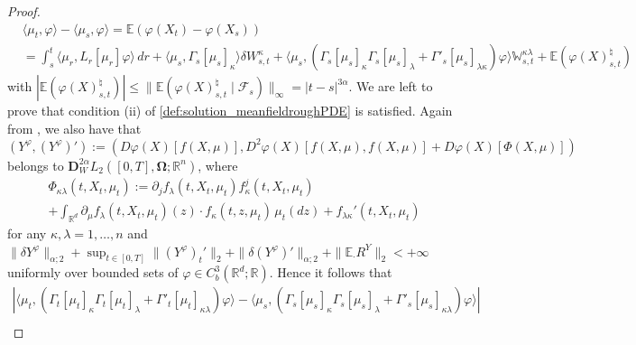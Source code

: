 \documentclass[10pt, a4paper]{article} %
\newcommand{\R}{\mathbb{R}}
\newcommand{\E}{\mathbb{E}}
\theoremstyle{definition}
\theoremstyle{plain}
\begin{document}
\begin{proof}
\begin{equation*}
        \begin{aligned}
            &\langle \mu_t , \varphi \rangle - \langle \mu_s , \varphi \rangle = \E(\varphi(X_t) - \varphi(X_s))  \\
            &= \int_s^t \langle \mu_r, L_r[\mu_r] \varphi \rangle \, dr + \langle \mu_s, \Gamma_s[\mu_s]_\kappa \rangle \delta W^\kappa_{s,t}  + \langle \mu_s, (\Gamma_s[\mu_s]_\kappa \Gamma_s[\mu_s]_\lambda + \Gamma'_s[\mu_s]_{\lambda \kappa} ) \varphi  \rangle \mathbb{W}^{\kappa\lambda}_{s,t} + \E(\varphi(X)^\natural_{s,t})
        \end{aligned}
    \end{equation*}
    with $|\E(\varphi(X)^\natural_{s,t})| \le \|\E(\varphi(X)^\natural_{s,t} \mid \mathcal{F}_s)\|_\infty = |t-s|^{3\alpha}$. 
    We are left to prove that condition (ii) of \cref{def:solution_meanfieldroughPDE} is satisfied. 
    Again from \cite[Theorem 4.13]{FHL21}, we also have that    
    \begin{equation*}
        (Y^\varphi,(Y^\varphi)'):=( D\varphi(X) [f(X,\mu)] , D^2 \varphi(X)[f(X,\mu), f(X,\mu)] + D\varphi(X) [\Phi(X,\mu)] ) 
    \end{equation*}
    belongs to $\mathbf{D}_W^{2\alpha}L_{2} ([0,T],\mathbf{\Omega};\R^n)$, where  \begin{multline*}
        \Phi_{\kappa\lambda} (t, X_t, \mu_t) := \partial_j f_\lambda(t,X_t, \mu_t) f^j_\kappa(t,X_t, \mu_t)  \\ + \int_{\R^d} \partial_\mu f_\lambda(t,X_t, \mu_t)(z) \cdot f_\kappa(t,z,\mu_t) \, \mu_t(dz) + f_{\lambda \kappa}'(t,X_t, \mu_t) 
    \end{multline*}
    for any $\kappa,\lambda=1,\dots,n$ and $\|\delta Y^\varphi\|_{\alpha;2} + \sup_{t \in [0,T]}\|(Y^\varphi)_t'\|_2 + \|\delta (Y^\varphi)'\|_{\alpha;2} + \|\E_\cdot R^Y\|_2 < +\infty$ uniformly over bounded sets of $\varphi \in C^3_b(\R^d;\R)$.  
    Hence it follows that \begin{multline*}
        | \langle  \mu_t, (\Gamma_t[\mu_t]_\kappa \Gamma_t[\mu_t]_\lambda + \Gamma'_t[\mu_t]_{\kappa\lambda} ) \varphi  \rangle - \langle \mu_s, (\Gamma_s[\mu_s]_\kappa \Gamma_s[\mu_s]_\lambda + \Gamma'_s[\mu_s]_{\kappa\lambda} ) \varphi  \rangle |  \\ 

\end{multline*}
\end{proof}
\end{document}
